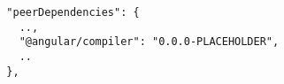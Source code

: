 \begin{verbatim}
  "peerDependencies": {
    ..,
    "@angular/compiler": "0.0.0-PLACEHOLDER",
    ..
  },
\end{verbatim}
